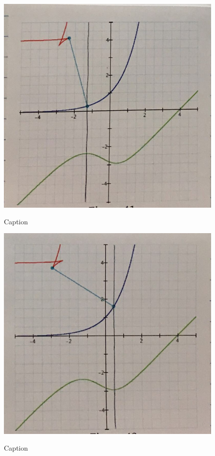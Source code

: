 \renewcommand\w{0.4\textwidth}
\renewcommand\fw{0.9\linewidth}
\renewcommand\fh{.25\textheight}

\begin{figure}[H]
  \centering
  \begin{minipage}[b]{\w}
    \label{divot:2}
    \includegraphics[width=\fw, height=\fh, keepaspectratio]{img/12-divot/02.png}
    \caption{Caption}
  \end{minipage}
  \begin{minipage}[b]{\w}
    \label{divot:3}
    \includegraphics[width=\fw, height=\fh, keepaspectratio]{img/12-divot/03.png}
    \caption{Caption}
  \end{minipage}
\end{figure}

